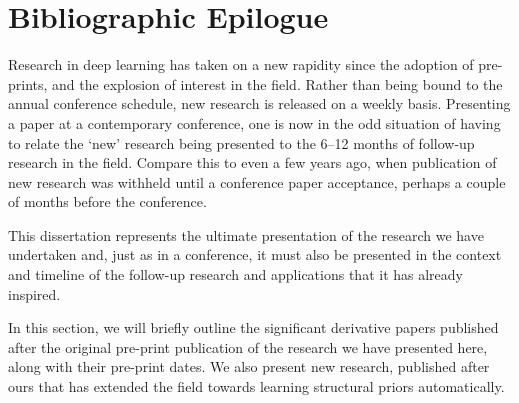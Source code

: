 \documentclass[thesis]{subfiles}
\begin{document}

\chapter{Bibliographic Epilogue}
\label{epilogue}
Research in deep learning has taken on a new rapidity since the adoption of pre-prints, and the explosion of interest in the field. Rather than being bound to the annual conference schedule, new research is released on a weekly basis. Presenting a paper at a contemporary conference, one is now in the odd situation of having to relate the `new' research being presented to the 6--12 months of follow-up research in the field. Compare this to even a few years ago, when publication of new research was withheld until a conference paper acceptance, perhaps a couple of months before the conference.

This dissertation represents the ultimate presentation of the research we have undertaken and, just as in a conference, it must also be presented in the context and timeline of the follow-up research and applications that it has already inspired.

In this section, we will briefly outline the significant derivative papers published after the original pre-print publication of the research we have presented here, along with their pre-print dates. We also present new research, published after ours that has extended the field towards learning structural priors automatically. 
\end{document}

